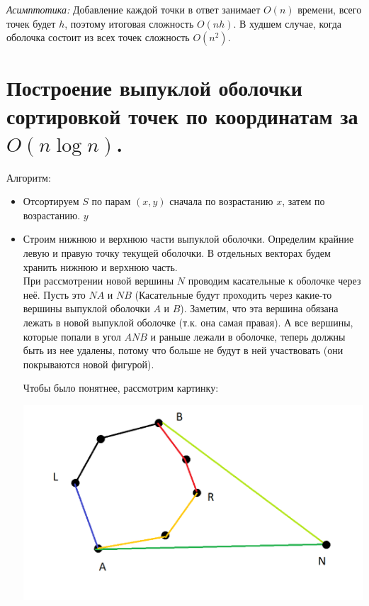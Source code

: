 \textit{Асимптотика:} Добавление каждой точки в ответ занимает $O(n)$ времени, всего точек будет $h$, поэтому итоговая сложность $O(nh)$. В худшем случае, когда оболочка состоит из всех точек сложность $O(n^2)$.

\newpage{}

\section{Построение выпуклой оболочки сортировкой точек по координатам за $O(n\log n)$.}

Алгоритм:

\begin{itemize}
    \item Отсортируем $S$ по парам $(x, y)$ сначала по возрастанию $x$, затем по возрастанию. $y$
    \item Строим нижнюю и верхнюю части выпуклой оболочки. Определим крайние левую и правую точку текущей оболочки. В отдельных векторах будем хранить нижнюю и верхнюю часть.\\
    
    При рассмотрении новой вершины $N$ проводим касательные к оболочке через неё. Пусть это $NA$ и $NB$ (Касательные будут проходить через какие-то вершины выпуклой оболочки $A$ и $B$). Заметим, что эта вершина обязана лежать в новой выпуклой оболочке (т.к. она самая правая). А все вершины, которые попали в угол $ANB$ и раньше лежали в оболочке, теперь должны быть из нее удалены, потому что больше не будут в ней участвовать (они покрываются новой фигурой).
    
    Чтобы было понятнее, рассмотрим картинку:
    
    \begin{minipage}[r]{0.2\linewidth} 
        \includegraphics[width=2\linewidth]{images/46_1.png}
    \end{minipage} \\
    

\end{itemize}
